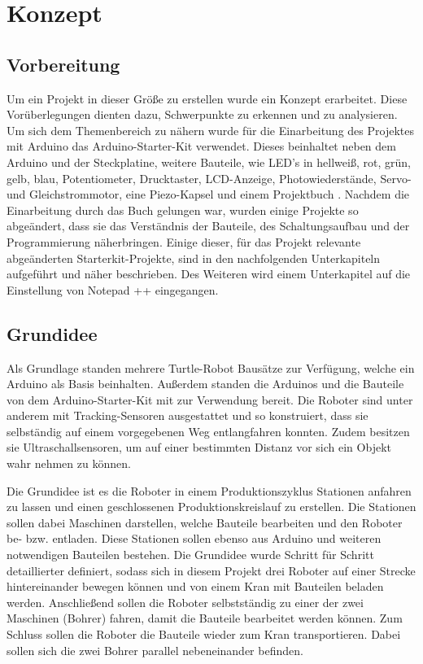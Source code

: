 \chapter{Konzept}

\section{Vorbereitung}

Um ein Projekt in dieser Größe zu erstellen wurde ein Konzept erarbeitet. Diese Vorüberlegungen dienten dazu, Schwerpunkte zu erkennen und zu analysieren. Um sich dem Themenbereich zu nähern wurde für die Einarbeitung des Projektes mit Arduino das Arduino-Starter-Kit verwendet. Dieses beinhaltet neben dem Arduino und der Steckplatine, weitere Bauteile, wie LED’s in hellweiß, rot, grün, gelb, blau, Potentiometer, Drucktaster, LCD-Anzeige, Photowiederstände, Servo- und Gleichstrommotor, eine Piezo-Kapsel und einem Projektbuch %
. Nachdem die Einarbeitung durch das Buch gelungen war, wurden einige Projekte so abgeändert, dass sie das Verständnis der Bauteile, des Schaltungsaufbau und der Programmierung näherbringen. Einige dieser, für das Projekt relevante abgeänderten Starterkit-Projekte, sind in den nachfolgenden Unterkapiteln aufgeführt und näher beschrieben. Des Weiteren wird einem Unterkapitel auf die Einstellung von Notepad ++ eingegangen.


\section{Grundidee}

Als Grundlage standen mehrere Turtle-Robot Bausätze zur Verfügung, welche ein Arduino als Basis beinhalten. Außerdem
standen die Arduinos und die Bauteile von dem Arduino-Starter-Kit mit zur Verwendung bereit. Die Roboter
sind unter anderem mit Tracking-Sensoren ausgestattet und so konstruiert, dass sie selbständig
auf einem vorgegebenen Weg entlangfahren konnten. Zudem besitzen sie Ultraschallsensoren,
um auf einer bestimmten Distanz vor sich ein Objekt wahr nehmen zu können.


Die Grundidee ist es die Roboter in einem Produktionszyklus Stationen anfahren zu lassen und einen geschlossenen Produktionskreislauf zu erstellen.  Die Stationen sollen dabei Maschinen darstellen, welche Bauteile bearbeiten und den Roboter be- bzw. entladen. Diese Stationen sollen ebenso aus Arduino und weiteren notwendigen Bauteilen  bestehen. Die Grundidee wurde Schritt für Schritt detaillierter definiert, sodass sich in diesem Projekt drei Roboter auf einer Strecke hintereinander bewegen können und von einem Kran mit Bauteilen beladen werden. Anschließend sollen die Roboter selbstständig zu einer der zwei Maschinen (Bohrer) fahren, damit die Bauteile bearbeitet werden können. Zum Schluss sollen die Roboter die Bauteile wieder zum
Kran transportieren. Dabei sollen sich die zwei Bohrer parallel nebeneinander befinden. 

